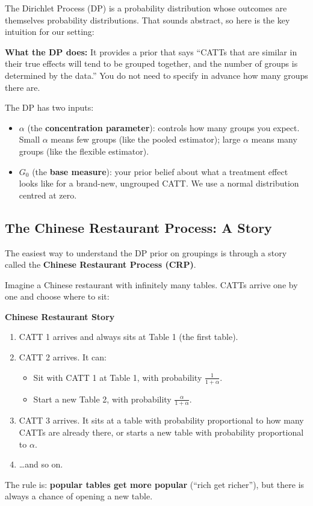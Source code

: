 \documentclass[12pt]{article}
\begin{document}
The Dirichlet Process (DP) is a probability distribution whose outcomes are
themselves probability distributions. That sounds abstract, so here is the key
intuition for our setting:

\begin{intuitionbox}
\textbf{What the DP does:} It provides a prior that says ``CATTs that are
similar in their true effects will tend to be grouped together, and the number
of groups is determined by the data.'' You do not need to specify in advance
how many groups there are.
\end{intuitionbox}

The DP has two inputs:
\begin{itemize}
  \item $\alpha$ (the \textbf{concentration parameter}): controls how many
    groups you expect. Small $\alpha$ means few groups (like the pooled
    estimator); large $\alpha$ means many groups (like the flexible estimator).
  \item $G_0$ (the \textbf{base measure}): your prior belief about what a
    treatment effect looks like for a brand-new, ungrouped CATT. We use a
    normal distribution centred at zero.
\end{itemize}

\subsection{The Chinese Restaurant Process: A Story}

The easiest way to understand the DP prior on groupings is through a
story called the \textbf{Chinese Restaurant Process (CRP)}.

Imagine a Chinese restaurant with infinitely many tables. CATTs arrive one by
one and choose where to sit:

\begin{examplebox}
\textbf{Chinese Restaurant Story}
\begin{enumerate}
  \item CATT 1 arrives and always sits at Table 1 (the first table).
  \item CATT 2 arrives. It can:
    \begin{itemize}[nosep]
      \item Sit with CATT 1 at Table 1, with probability $\frac{1}{1+\alpha}$.
      \item Start a new Table 2, with probability $\frac{\alpha}{1+\alpha}$.
    \end{itemize}
  \item CATT 3 arrives. It sits at a table with probability proportional to
    how many CATTs are already there, or starts a new table with probability
    proportional to $\alpha$.
  \item \ldots and so on.
\end{enumerate}
The rule is: \textbf{popular tables get more popular} (``rich get richer''),
but there is always a chance of opening a new table.
\end{examplebox}
\end{document}
